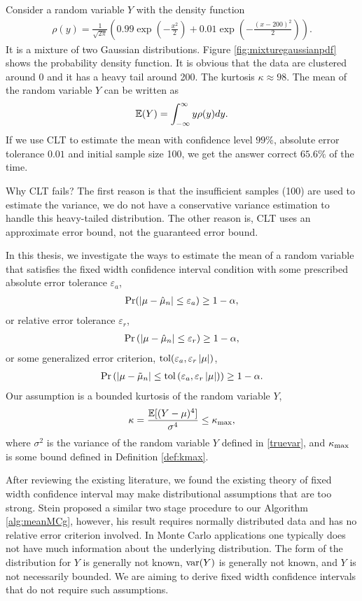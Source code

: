 \documentclass{iitthesis}
\theoremstyle{definition}
\begin{document}
Consider a random variable $Y$ with the density function 
\begin{align}\label{pdfy}
\rho(y) = \frac{1}{\sqrt{2\pi}}\left(0.99\exp\left(-\frac{x^2}{2}\right)+0.01\exp\left(-\frac{(x-200)^2}{2}\right)\right).
\end{align}
It is a mixture of two Gaussian distributions. Figure \ref{fig:mixturegaussianpdf} shows the probability density function. It is obvious that the data are clustered around 0 and it has a heavy tail around 200. The kurtosis $\kappa \approx 98$. The mean of the random variable $Y$ can be written as
$$\mathbb{E}(Y) = \int_{-\infty}^\infty y\rho(y)dy.$$
If we use CLT to estimate the mean with confidence level $99\%$, absolute error tolerance $0.01$ and initial sample size 100, we get the answer correct $65.6\%$ of the time.

Why CLT fails? The first reason is that the insufficient samples (100) are used to estimate the variance, we do not have a conservative variance estimation to handle this heavy-tailed distribution. The other reason is, CLT uses an approximate error bound, not the guaranteed error bound.

In this thesis, we investigate the ways to estimate the mean of a random variable that satisfies the fixed width confidence interval condition with some prescribed absolute error tolerance $\varepsilon_a$,  
\begin{align}\label{absCI}
\Pr(\left \lvert \mu-\hat{\mu}_n \right \rvert \leq \varepsilon_a) \geq 1-\alpha,
\end{align}
or relative error tolerance $\varepsilon_r$,
\begin{align}\label{relCI}
\Pr\left(\left \lvert \mu-\hat{\mu}_n \right \rvert\leq \varepsilon_r\right) \geq 1-\alpha,
\end{align}
or some generalized error criterion, $\operatorname{tol}(\varepsilon_a,\varepsilon_r \left \lvert \mu \right \rvert)$, 
\begin{align}\label{hybridCI}
\Pr\left(\left \lvert \mu-\tilde{\mu}_n \right \rvert\leq \operatorname{tol}\left(\varepsilon_a, \varepsilon_r\left \lvert \mu \right \rvert\right)\right) \geq 1-\alpha.
\end{align}
Our assumption is a bounded kurtosis of the random variable $Y$,
\begin{equation} \label{def:boundedkurtosis}
\kappa = \frac{\mathbb{E}[(Y-\mu)^4]}{\sigma^4} \le \kappa_{\max},
\end{equation}
where $\sigma^2$ is the variance of the random variable $Y$ defined in \eqref{truevar}, and $\kappa_{\max}$ is some bound defined in Definition \ref{def:kmax}. 

After reviewing the existing literature, we found the existing theory of fixed width confidence interval may make distributional assumptions that are too strong. Stein \cite{stein45} proposed a similar two stage procedure to our Algorithm \ref{alg:meanMCg}, however, his result requires normally distributed data and has no relative error criterion involved. In Monte Carlo applications one typically does not have much information about the underlying distribution. The form of the distribution for $Y$ is generally not known, $\operatorname{var}(Y)$ is generally not known, and $Y$ is not necessarily bounded. We are aiming to derive fixed width confidence intervals that do not require such assumptions.  
\end{document}
